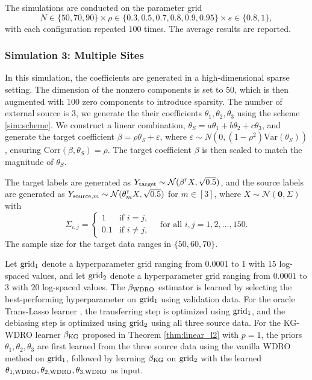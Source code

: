 \documentclass[12pt]{article}
\begin{document}
The simulations are conducted on the parameter grid $$N \in \{50, 70, 90\} \times \rho \in \{0.3, 0.5, 0.7, 0.8, 0.9, 0.95\} \times s \in \{0.8, 1\},$$ with each configuration repeated $100$ times. The average results are reported.

\subsubsection{Simulation 3: Multiple Sites}
In this simulation, the coefficients are generated in a high-dimensional sparse setting. The dimension of the nonzero components is set to 50, which is then augmented with 100 zero components to introduce sparsity. The number of external source is 3, we generate the their coefficients $\theta_1,\theta_2,\theta_3$ using the scheme \eqref{sim:scheme}. We construct a linear combination, $\theta_S = a\theta_1 + b\theta_2 + c\theta_3$, and generate the target coefficient $\beta = \rho \theta_S + \varepsilon$, where $\varepsilon \sim N(0, (1-\rho^2)\mathrm{Var}(\theta_S))$, ensuring $\mathrm{Corr}(\beta, \theta_S) = \rho$. The target coefficient $\beta$ is then scaled to match the magnitude of $\theta_S$.

The target labels are generated as $Y_{\rm target} \sim \mathcal{N}(\beta^{\scriptscriptstyle \sf T} X , \sqrt{0.5})$, and the source labels are generated as $Y_{{\rm source},m} \sim  \mathcal{N}(\theta_m^{\scriptscriptstyle \sf T} X , \sqrt{0.5})$ for $m\in [3]$, where $X\sim \mathcal{N}(\mathbf{0}, \Sigma)$ with \[
\Sigma_{i,j} = 
\begin{cases}
1 & \text{if } i = j, \\
0.1 & \text{if } i \neq j,
\end{cases}
\quad \text{for all } i, j = 1, 2, \dots, 150.
\] The sample size for the target data ranges in $\{50,60,70\}$.

Let $\rm grid_1$ denote a hyperparameter grid ranging from $0.0001$ to $1$ with $15$ log-spaced values, and let $\rm grid_2$ denote a hyperparameter grid ranging from $0.0001$ to $3$ with $20$ log-spaced values. The $\beta_{\rm WDRO}$ estimator is learned by selecting the best-performing hyperparameter on $\rm grid_1$ using validation data. For the oracle Trans-Lasso learner \citep[Algorithm 1]{li2021translasso}, the transferring step is optimized using $\rm grid_1$, and the debiasing step is optimized using $\rm grid_2$ using all three source data. For the KG-WDRO learner $\beta_{\rm KG}$ proposed in Theorem \ref{thm:linear_l2} with $p=1$, the priors $\theta_1,\theta_2,\theta_3$ are first learned from the three source data using the vanilla WDRO method on $\rm grid_1$, followed by learning $\beta_{\rm KG}$ on $\rm grid_2$ with the learned $\theta_{1,\rm WDRO},\theta_{2,\rm WDRO},\theta_{3,\rm WDRO}$ as input.
\end{document}
